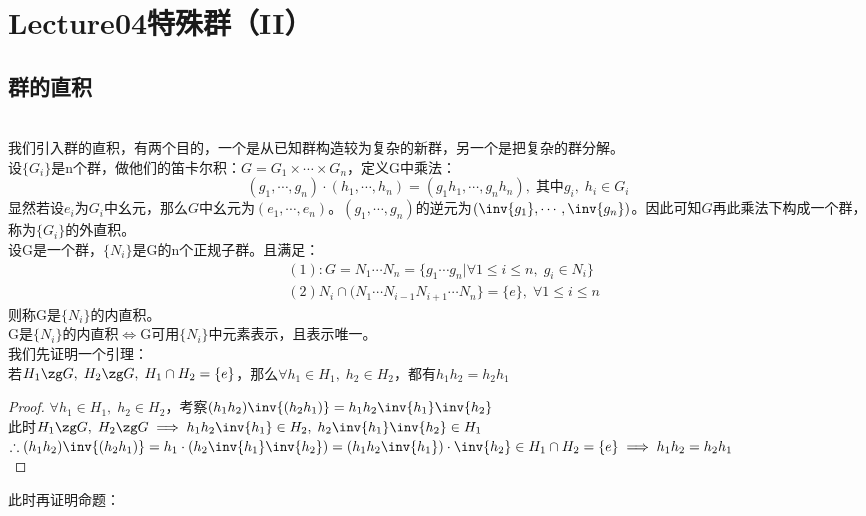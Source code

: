 \chapter*{Lecture04特殊群（II）}

\section{群的直积}
\\
我们引入群的直积，有两个目的，一个是从已知群构造较为复杂的新群，另一个是把复杂的群分解。\\
设$\{G_i\}$是n个群，做他们的笛卡尔积：$G=G_1\times \cdots \times G_n$，定义G中乘法：
\[
(g_1,\cdots,g_n)\cdot (h_1,\cdots,h_n)=(g_1h_1,\cdots,g_nh_n),\;\text{其中}g_i,\; h_i\in G_i
\]
显然若设$e_i$为$G_i$中幺元，那么$G$中幺元为$(e_1,\cdots,e_n)$。$(g_1,\cdots,g_n)$的逆元为$(\inv{g_1},\cdots,\inv{g_n})$。因此可知$G$再此乘法下构成一个群，称为$\{G_i\}$的外直积。\\
设G是一个群，$\{N_i\}$是G的n个正规子群。且满足：
\[
\begin{aligned}
&(1):G=N_1\cdots N_n=\{g_1\cdots g_n|\forall 1\leq i \leq n,\;g_i\in N_i\}\\
&(2)N_i\cap(N_1\cdots N_{i-1}N_{i+1}\cdots N_n\}=\{e\},\; \forall 1\leq i \leq n
\end{aligned}
\]
则称G是$\{N_i\}$的内直积。\\
G是$\{N_i\}$的内直积$\iff$G可用$\{N_i\}$中元素表示，且表示唯一。\\
我们先证明一个引理：\\
若$H_1\zg G,\; H_2\zg G,\; H_1\cap H_2=\{e\}$，那么$\forall h_1\in H_1,\; h_2\in H_2$，都有$h_1h_2=h_2h_1$\\
\begin{proof}
$\forall h_1\in H_1,\; h_2\in H_2$，考察$(h_1h_2)\inv{(h_2h_1)}=h_1h_2\inv{h_1}\inv{h_2}$\\
此时$H_1\zg G,\; H_2\zg G\implies h_1h_2\inv{h_1}\in H_2,\; h_2\inv{h_1}\inv{h_2}\in H_1$\\
$\therefore (h_1h_2)\inv{(h_2h_1)}=h_1\cdot (h_2\inv{h_1}\inv{h_2})=(h_1h_2\inv{h_1})\cdot \inv{h_2}\in H_1\cap H_2=\{e\}\implies h_1h_2=h_2h_1$\\
\end{proof}
此时再证明命题：
